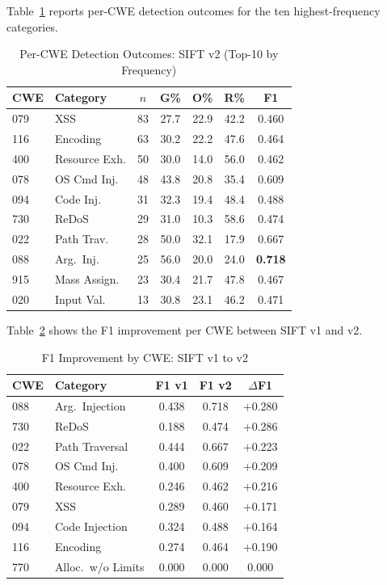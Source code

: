 \documentclass[conference]{IEEEtran}
\begin{document}
Table~\ref{tab_percwe} reports per-CWE detection outcomes for the ten highest-frequency categories.

\begin{table}[htbp]
\caption{Per-CWE Detection Outcomes: SIFT v2 (Top-10 by Frequency)}
\begin{center}
\begin{tabular}{|l|l|c|c|c|c|c|}
\hline
\textbf{CWE} & \textbf{Category} & $n$ & \textbf{G\%} & \textbf{O\%} & \textbf{R\%} & \textbf{F1} \\
\hline
079 & XSS & 83 & 27.7 & 22.9 & 42.2 & 0.460 \\
\hline
116 & Encoding & 63 & 30.2 & 22.2 & 47.6 & 0.464 \\
\hline
400 & Resource Exh. & 50 & 30.0 & 14.0 & 56.0 & 0.462 \\
\hline
078 & OS Cmd Inj. & 48 & 43.8 & 20.8 & 35.4 & 0.609 \\
\hline
094 & Code Inj. & 31 & 32.3 & 19.4 & 48.4 & 0.488 \\
\hline
730 & ReDoS & 29 & 31.0 & 10.3 & 58.6 & 0.474 \\
\hline
022 & Path Trav. & 28 & 50.0 & 32.1 & 17.9 & 0.667 \\
\hline
088 & Arg.\ Inj. & 25 & 56.0 & 20.0 & 24.0 & \textbf{0.718} \\
\hline
915 & Mass Assign. & 23 & 30.4 & 21.7 & 47.8 & 0.467 \\
\hline
020 & Input Val. & 13 & 30.8 & 23.1 & 46.2 & 0.471 \\
\hline
\end{tabular}
\label{tab_percwe}
\end{center}
\end{table}

Table~\ref{tab_cwedelta} shows the F1 improvement per CWE between SIFT v1 and v2.

\begin{table}[htbp]
\caption{F1 Improvement by CWE: SIFT v1 to v2}
\begin{center}
\begin{tabular}{|l|l|c|c|c|}
\hline
\textbf{CWE} & \textbf{Category} & \textbf{F1 v1} & \textbf{F1 v2} & \textbf{$\Delta$F1} \\
\hline
088 & Arg.\ Injection & 0.438 & 0.718 & +0.280 \\
\hline
730 & ReDoS & 0.188 & 0.474 & +0.286 \\
\hline
022 & Path Traversal & 0.444 & 0.667 & +0.223 \\
\hline
078 & OS Cmd Inj. & 0.400 & 0.609 & +0.209 \\
\hline
400 & Resource Exh. & 0.246 & 0.462 & +0.216 \\
\hline
079 & XSS & 0.289 & 0.460 & +0.171 \\
\hline
094 & Code Injection & 0.324 & 0.488 & +0.164 \\
\hline
116 & Encoding & 0.274 & 0.464 & +0.190 \\
\hline
770 & Alloc.\ w/o Limits & 0.000 & 0.000 & 0.000 \\
\hline
\end{tabular}
\label{tab_cwedelta}
\end{center}
\end{table}
\end{document}
